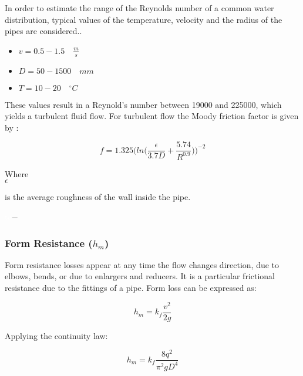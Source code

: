 In order to estimate the range of the Reynolds number of a common water 
distribution, typical values of the temperature, velocity and the radius of 
the pipes are considered.\cite{Urban_Design}. 

\begin{itemize}
  \item $v = 0.5 - 1.5  \quad \frac{m}{s}$
  \item $D = 50 - 1500\quad mm$
  \item $T = 10 - 20 \quad ^{\circ} C$
\end{itemize}

These values result in a Reynold's number between 19000 and 225000, which yields a turbulent fluid flow. For turbulent flow the 
Moody friction factor is given by \cite{Design_Water} : 

\begin{equation}
  f = 1.325 \bigg(ln\bigg(\frac{\epsilon}{3.7 D}+\frac{5.74}{R^{0.9}}\bigg)\bigg)^{-2}
  \label{turbulent}
\end{equation}

\begin{minipage}[t]{0.20\textwidth}
Where\\
\hspace*{8mm} $\epsilon$ 
\end{minipage}
\begin{minipage}[t]{0.68\textwidth}
\vspace*{2mm}
is the average roughness of the wall inside the pipe.
 \end{minipage}
\begin{minipage}[t]{0.10\textwidth}
\vspace*{2mm}
\textcolor{White}{te}$\unit{-}$
\end{minipage}

%
\subsubsection{Form Resistance (\texorpdfstring{$h_m$}{})} 
Form resistance losses appear at any time the flow changes direction, due to elbows, bends,
or due to enlargers and reducers. It is a particular frictional resistance due to the 
fittings of a pipe. Form loss can be expressed as:

\begin{equation}
  h_m = k_f \frac{v^2}{2g}
\end{equation}


Applying the continuity law:

\begin{equation}
   h_m = k_f \frac{8q^2}{\pi^2gD^4}
\label{Formloss}
\end{equation}


